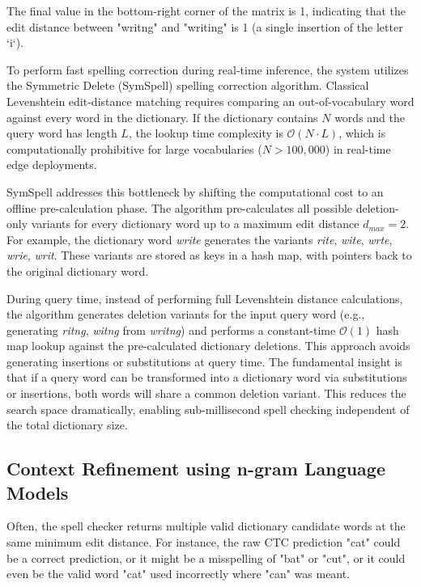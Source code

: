 The final value in the bottom-right corner of the matrix is 1, indicating that the edit distance between "writng" and "writing" is 1 (a single insertion of the letter `i`).

To perform fast spelling correction during real-time inference, the system utilizes the Symmetric Delete (SymSpell) spelling correction algorithm. Classical Levenshtein edit-distance matching requires comparing an out-of-vocabulary word against every word in the dictionary. If the dictionary contains $N$ words and the query word has length $L$, the lookup time complexity is $\mathcal{O}(N \cdot L)$, which is computationally prohibitive for large vocabularies ($N > 100,000$) in real-time edge deployments.

SymSpell addresses this bottleneck by shifting the computational cost to an offline pre-calculation phase. The algorithm pre-calculates all possible deletion-only variants for every dictionary word up to a maximum edit distance $d_{max} = 2$. For example, the dictionary word \textit{write} generates the variants \textit{rite}, \textit{wite}, \textit{wrte}, \textit{wrie}, \textit{writ}. These variants are stored as keys in a hash map, with pointers back to the original dictionary word. 

During query time, instead of performing full Levenshtein distance calculations, the algorithm generates deletion variants for the input query word (e.g., generating \textit{ritng}, \textit{witng} from \textit{writng}) and performs a constant-time $\mathcal{O}(1)$ hash map lookup against the pre-calculated dictionary deletions. This approach avoids generating insertions or substitutions at query time. The fundamental insight is that if a query word can be transformed into a dictionary word via substitutions or insertions, both words will share a common deletion variant. This reduces the search space dramatically, enabling sub-millisecond spell checking independent of the total dictionary size.

\subsection{Context Refinement using n-gram Language Models}
Often, the spell checker returns multiple valid dictionary candidate words at the same minimum edit distance. For instance, the raw CTC prediction "cat" could be a correct prediction, or it might be a misspelling of "bat" or "cut", or it could even be the valid word "cat" used incorrectly where "can" was meant. 

